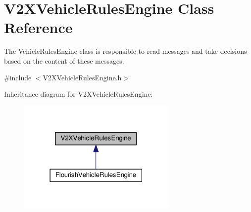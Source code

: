 \hypertarget{classV2XVehicleRulesEngine}{}\section{V2\+X\+Vehicle\+Rules\+Engine Class Reference}
\label{classV2XVehicleRulesEngine}


The Vehicle\+Rules\+Engine class is responsible to read messages and take decisions based on the content of these messages.  




{\ttfamily \#include $<$V2\+X\+Vehicle\+Rules\+Engine.\+h$>$}



Inheritance diagram for V2\+X\+Vehicle\+Rules\+Engine\+:\nopagebreak
\begin{figure}[H]
\begin{center}
\leavevmode
\includegraphics[width=219pt]{classV2XVehicleRulesEngine__inherit__graph}
\end{center}
\end{figure}
